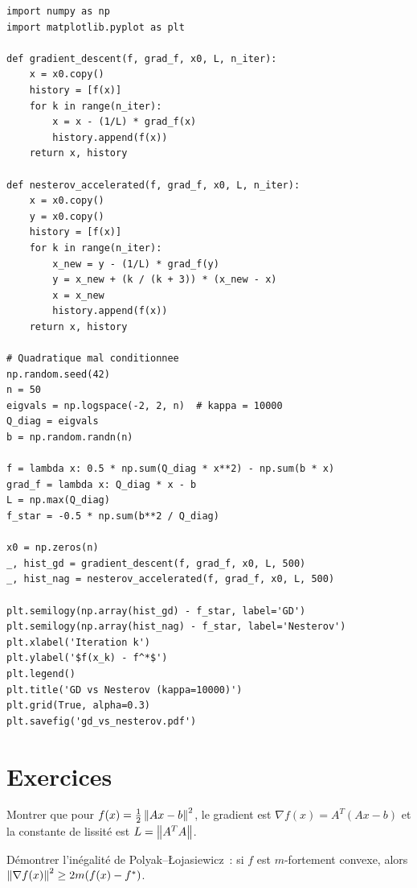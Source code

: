 \begin{codeblock}[title=\textbf{Comparaison GD, Nesterov et SGD}]
\begin{verbatim}
import numpy as np
import matplotlib.pyplot as plt

def gradient_descent(f, grad_f, x0, L, n_iter):
    x = x0.copy()
    history = [f(x)]
    for k in range(n_iter):
        x = x - (1/L) * grad_f(x)
        history.append(f(x))
    return x, history

def nesterov_accelerated(f, grad_f, x0, L, n_iter):
    x = x0.copy()
    y = x0.copy()
    history = [f(x)]
    for k in range(n_iter):
        x_new = y - (1/L) * grad_f(y)
        y = x_new + (k / (k + 3)) * (x_new - x)
        x = x_new
        history.append(f(x))
    return x, history

# Quadratique mal conditionnee
np.random.seed(42)
n = 50
eigvals = np.logspace(-2, 2, n)  # kappa = 10000
Q_diag = eigvals
b = np.random.randn(n)

f = lambda x: 0.5 * np.sum(Q_diag * x**2) - np.sum(b * x)
grad_f = lambda x: Q_diag * x - b
L = np.max(Q_diag)
f_star = -0.5 * np.sum(b**2 / Q_diag)

x0 = np.zeros(n)
_, hist_gd = gradient_descent(f, grad_f, x0, L, 500)
_, hist_nag = nesterov_accelerated(f, grad_f, x0, L, 500)

plt.semilogy(np.array(hist_gd) - f_star, label='GD')
plt.semilogy(np.array(hist_nag) - f_star, label='Nesterov')
plt.xlabel('Iteration k')
plt.ylabel('$f(x_k) - f^*$')
plt.legend()
plt.title('GD vs Nesterov (kappa=10000)')
plt.grid(True, alpha=0.3)
plt.savefig('gd_vs_nesterov.pdf')
\end{verbatim}
\end{codeblock}

\section{Exercices}

\begin{exercice}[$\star$]
Montrer que pour $f(x) = \frac{1}{2}\left\| Ax-b \right\|^2$, le gradient est $\nabla f(x) = A^T(Ax-b)$
et la constante de lissit\'e est $L = \left\| A^TA \right\|$.
\end{exercice}

\begin{exercice}[$\star\star$]
D\'emontrer l'in\'egalit\'e de Polyak--\L{}ojasiewicz~: si $f$ est $m$-fortement
convexe, alors $\left\| \nabla f(x) \right\|^2 \geq 2m(f(x) - f^*)$.
\end{exercice}

